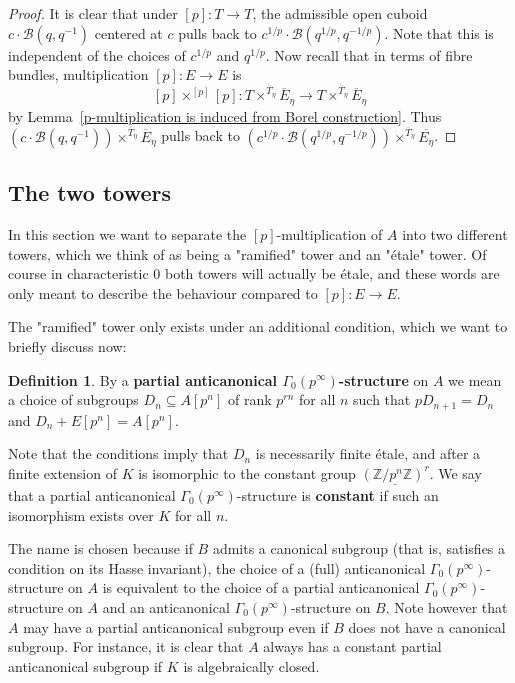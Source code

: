 \documentclass[11pt,oneside]{amsart}
\theoremstyle{definition}
\newtheorem{definition}[theorem]{Definition}
\theoremstyle{remark}
\begin{document}
	\begin{proof}
		It is clear that under $[p]:T\rightarrow T$, the admissible open cuboid $c\cdot \mathcal B(q,q^{-1})$ centered at $c$ pulls back to $c^{1/p}\cdot \mathcal B(q^{1/p},q^{-1/p})$. Note that this is independent of the choices of $c^{1/p}$ and $q^{1/p}$. Now recall that in terms of fibre bundles, multiplication $[p]:E\rightarrow E$ is
		\[[p]\times^{[p]}[p]: T\times^{\overline{T}_\eta}\overline{E}_\eta\rightarrow T\times^{\overline{T}_\eta}\overline{E}_\eta \]
		by Lemma~\ref{p-multiplication is induced from Borel construction}. Thus $(c\cdot \mathcal B(q,q^{-1}))\times^{\overline{T}_\eta}\overline{E}_\eta$ pulls back to $(c^{1/p}\cdot \mathcal B(q^{1/p},q^{-1/p}))\times^{\overline{T}_\eta}\overline{E_\eta}$.
	\end{proof}

	\subsection{The two towers}
	In this section we want to separate the $[p]$-multiplication of $A$ into two different towers, which we think of as being a "ramified" tower and an "\'etale" tower. Of course in characteristic $0$ both towers will actually be \'etale, and these words are only meant to describe the behaviour compared to $[p]:E\rightarrow E$.
	
	The "ramified" tower only exists under an additional condition, which we want to briefly discuss now:
	\begin{definition}
		By a \textbf{partial anticanonical $\Gamma_0(p^\infty)$-structure} on $A$ we mean a choice of subgroups $D_n\subseteq A[p^n]$ of rank $p^{rn}$ for all $n$ such that $pD_{n+1}=D_n$ and $D_n+E[p^n]=A[p^n]$. 
		
		Note that the conditions imply that $D_n$ is necessarily finite \'etale, and after a finite extension of $K$ is isomorphic to the constant group $\underline{(\mathbb Z/p^n\mathbb Z)^{r}}$. We say that a partial anticanonical $\Gamma_0(p^\infty)$-structure is \textbf{constant} if such an isomorphism exists over $K$ for all $n$.
	\end{definition}
	The name is chosen because if $B$ admits a canonical subgroup (that is, satisfies a condition on its Hasse invariant), the choice of a (full) anticanonical $\Gamma_0(p^\infty)$-structure on $A$ is equivalent to the choice of a partial anticanonical $\Gamma_0(p^\infty)$-structure on $A$ and an anticanonical $\Gamma_0(p^\infty)$-structure on $B$. Note however that $A$ may have a partial anticanonical subgroup even if $B$ does not have a canonical subgroup. For instance, it is clear that $A$ always has a constant partial anticanonical subgroup if $K$ is algebraically closed.
	
\end{document}
